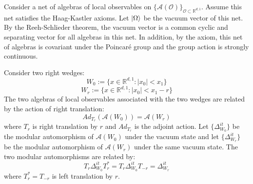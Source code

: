 \documentclass[a4paper,11pt]{article}
\theoremstyle{definition}
\begin{document}
Consider a net of algebras of local observables on $\{\mathcal{A}(\mathcal{O})\}_{\mathcal{O}\subset\mathbb{R}^{d,1}}$. Assume this net satisfies the Haag-Kastler axioms. Let $\ket{\Omega}$ be the vacuum vector of this net. By the Reeh-Schlieder theorem, the vacuum vector is a common cyclic and separating vector for all algebras in this net. In addition, by the axiom, this net of algebras is covariant under the Poincaré group and the group action is strongly continuous.

Consider two right wedges:
\begin{equation}
    W_0 := \{x\in\mathbb{R}^{d,1}: |x_0| < x_1\}
\end{equation}
\begin{equation}
    W_{r} := \{x\in\mathbb{R}^{d,1}: |x_0 | < x_1 - r \}
\end{equation}
The two algebras of local observables associated with the two wedges are related by the action of right translation:
\begin{equation}
    Ad_{T_r}(\mathcal{A}(W_0)) = \mathcal{A}(W_r)
\end{equation}
where $T_r$ is right translation by $r$ and $Ad_{T_r}$ is the adjoint action. Let $\{\Delta_{W_0}^{it}\}$ be the modular automorphism of $\mathcal{A}(W_0)$ under the vacuum state and let $\{\Delta_{W_r}^{it}\}$ be the modular automorphism of $\mathcal{A}(W_r)$ under the same vacuum state. The two modular automorphisms are related by:
\begin{equation}
    T_r\Delta_{W_0}^{it}T_r^* = T_r\Delta_{W_0}^{it}T_{-r} = \Delta^{it}_{W_r}
\end{equation}
where $T_r^* = T_{-r}$ is left translation by $r$.
\end{document}
